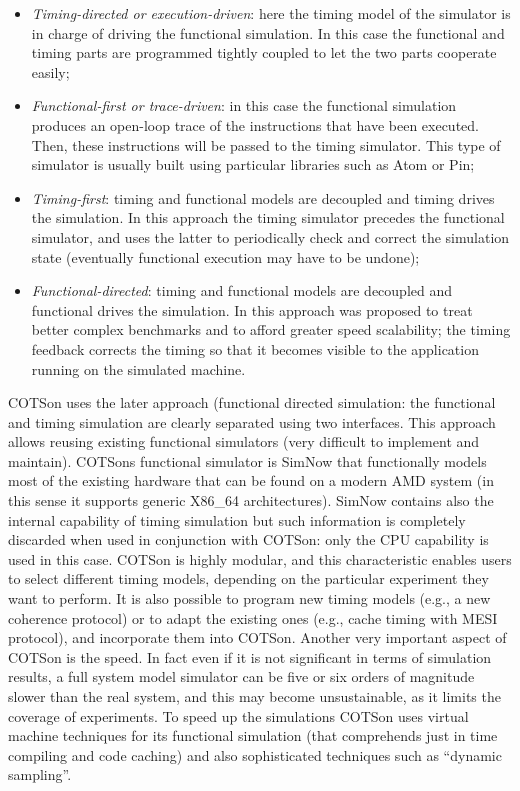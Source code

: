 \documentclass[a4paper]{article}
\begin{document}
\begin{itemize}
\item {
\textit{Timing-directed or execution-driven}: here the timing model of
the simulator is in charge of driving the functional simulation. In
this case the functional and timing parts are programmed tightly
coupled to let the two parts cooperate easily;}
\item {
\textit{Functional-first or trace-driven}: in this case the functional
simulation produces an open-loop trace of the instructions that have
been executed. Then, these instructions will be passed to the timing
simulator. This type of simulator is usually built using particular
libraries such as Atom or Pin;}
\item {
\textit{Timing-first}: timing and functional models are decoupled and
timing drives the simulation. In this approach the timing simulator
precedes the functional simulator, and uses the latter to periodically
check and correct the simulation state (eventually functional execution
may have to be undone);}
\item {
\textit{Functional-directed}: timing and functional models are decoupled
and functional drives the simulation. In this approach was proposed to
treat better complex benchmarks and to afford greater speed
scalability; the timing feedback corrects the timing so that it becomes
visible to the application running on the simulated machine.}
\end{itemize}
{
COTSon uses the later approach (functional directed simulation: the
functional and timing simulation are clearly separated using two
interfaces. This approach allows reusing existing functional simulators
(very difficult to implement and maintain). COTSon{\textquotesingle}s
functional simulator is SimNow that functionally models most of the
existing hardware that can be found on a modern AMD system (in this
sense it supports generic X86\_64 architectures). SimNow contains also
the internal capability of timing simulation but such information is
completely discarded when used in conjunction with COTSon: only the CPU
capability is used in this case. COTSon is highly modular, and this
characteristic enables users to select different timing models,
depending on the particular experiment they want to perform. It is also
possible to program new timing models (e.g., a new coherence protocol)
or to adapt the existing ones (e.g., cache timing with MESI protocol),
and incorporate them into COTSon. Another very important aspect of
COTSon is the speed. In fact even if it is not significant in terms of
simulation results, a full system model simulator can be five or six
orders of magnitude slower than the real system, and this may become
unsustainable, as it limits the coverage of experiments. To speed up
the simulations COTSon uses virtual machine techniques for its
functional simulation (that comprehends just in time compiling and code
caching) and also sophisticated techniques such as
{\textquotedblleft}dynamic sampling{\textquotedblright}.}
\end{document}
